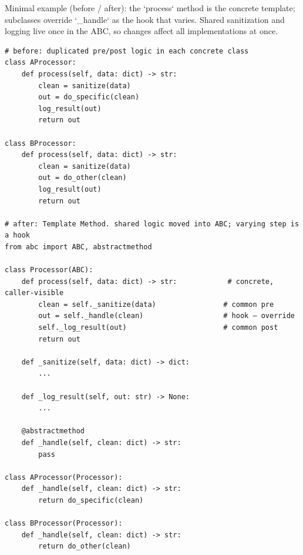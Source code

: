 Minimal example (before / after): the `process` method is the concrete template; subclasses override `_handle` as the hook that varies. Shared sanitization and logging live once in the ABC, so changes affect all implementations at once.

\begin{verbatim}
# before: duplicated pre/post logic in each concrete class
class AProcessor:
    def process(self, data: dict) -> str:
        clean = sanitize(data)
        out = do_specific(clean)
        log_result(out)
        return out

class BProcessor:
    def process(self, data: dict) -> str:
        clean = sanitize(data)
        out = do_other(clean)
        log_result(out)
        return out

# after: Template Method. shared logic moved into ABC; varying step is a hook
from abc import ABC, abstractmethod

class Processor(ABC):
    def process(self, data: dict) -> str:            # concrete, caller-visible
        clean = self._sanitize(data)                # common pre
        out = self._handle(clean)                   # hook — override
        self._log_result(out)                       # common post
        return out

    def _sanitize(self, data: dict) -> dict:
        ...

    def _log_result(self, out: str) -> None:
        ...

    @abstractmethod
    def _handle(self, clean: dict) -> str:
        pass

class AProcessor(Processor):
    def _handle(self, clean: dict) -> str:
        return do_specific(clean)

class BProcessor(Processor):
    def _handle(self, clean: dict) -> str:
        return do_other(clean)
\end{verbatim}

